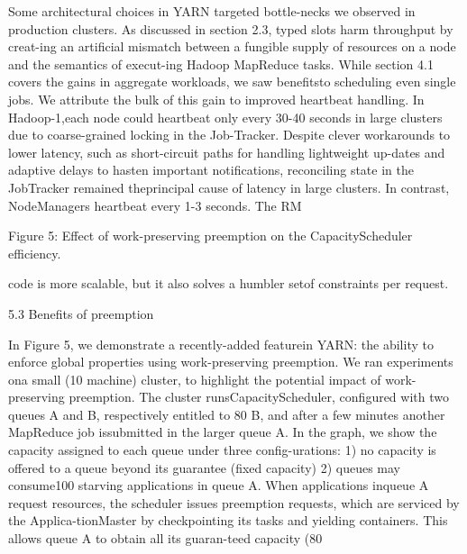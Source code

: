 Some architectural choices in YARN targeted bottle-necks we observed in production clusters. As discussed
in section 2.3, typed slots harm throughput by creat-ing an artificial mismatch between a fungible supply
of resources on a node and the semantics of execut-ing Hadoop MapReduce tasks. While section 4.1 covers the gains in aggregate workloads, we saw benefitsto scheduling even single jobs. We attribute the bulk of
this gain to improved heartbeat handling. In Hadoop-1,each node could heartbeat only every 30-40 seconds in
large clusters due to coarse-grained locking in the Job-Tracker. Despite clever workarounds to lower latency,
such as short-circuit paths for handling lightweight up-dates and adaptive delays to hasten important notifications, reconciling state in the JobTracker remained theprincipal cause of latency in large clusters. In contrast,
NodeManagers heartbeat every 1-3 seconds. The RM

Figure 5: Effect of work-preserving preemption on the CapacityScheduler efficiency.

code is more scalable, but it also solves a humbler setof constraints per request.

5.3 Benefits of preemption

In Figure 5, we demonstrate a recently-added featurein YARN: the ability to enforce global properties using work-preserving preemption. We ran experiments ona small (10 machine) cluster, to highlight the potential
impact of work-preserving preemption. The cluster runsCapacityScheduler, configured with two queues A and
B, respectively entitled to 80%
B, and after a few minutes another MapReduce job issubmitted in the larger queue A. In the graph, we show
the capacity assigned to each queue under three config-urations: 1) no capacity is offered to a queue beyond
its guarantee (fixed capacity) 2) queues may consume100%
starving applications in queue A. When applications inqueue A request resources, the scheduler issues preemption requests, which are serviced by the Applica-tionMaster by checkpointing its tasks and yielding containers. This allows queue A to obtain all its guaran-teed capacity (80%

